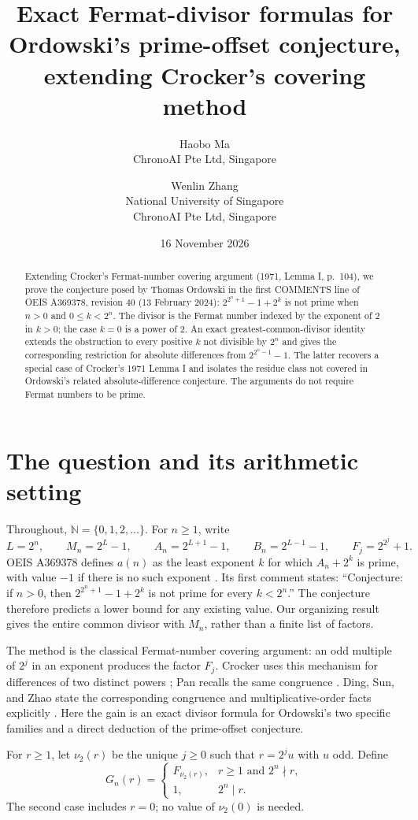 \documentclass[11pt]{article}
\title{Exact Fermat-divisor formulas for Ordowski's prime-offset conjecture, extending Crocker's covering method}
\author{Haobo Ma\\
  \small ChronoAI Pte Ltd, Singapore
  \and Wenlin Zhang\\
  \small National University of Singapore\\
  \small ChronoAI Pte Ltd, Singapore}
\date{16 November 2026}
\newcommand{\NN}{\mathbb{N}}
\newcommand{\vTwo}{\nu_2}
\begin{document}
\maketitle
\begin{abstract}
Extending Crocker's Fermat-number covering argument (1971, Lemma I, p.~104),
we prove the conjecture posed by Thomas Ordowski in the first COMMENTS line
of OEIS A369378, revision 40 (13 February 2024):
$2^{2^n+1}-1+2^k$ is not prime when $n>0$ and $0\leq k<2^n$.
The divisor is the Fermat number indexed by the exponent of $2$ in $k>0$;
the case $k=0$ is a power of $2$.
An exact greatest-common-divisor identity extends the obstruction to every
positive $k$ not divisible by $2^n$ and gives the corresponding restriction
for absolute differences from $2^{2^n-1}-1$.
The latter recovers a special case of Crocker's 1971 Lemma I and isolates
the residue class not covered in Ordowski's related absolute-difference
conjecture. The arguments do not require Fermat numbers to be prime.
\end{abstract}

\section{The question and its arithmetic setting}
Throughout, $\NN=\{0,1,2,\ldots\}$. For $n\geq1$, write
\[
 L=2^n,\qquad M_n=2^L-1,\qquad
 A_n=2^{L+1}-1,\qquad B_n=2^{L-1}-1,
 \qquad F_j=2^{2^j}+1.
\]
OEIS A369378 defines $a(n)$ as the least exponent $k$ for which $A_n+2^k$
is prime, with value $-1$ if there is no such exponent \cite{oeis}.
Its first comment states: ``Conjecture: if $n>0$, then
$2^{2^n+1}-1+2^k$ is not prime for every $k<2^n$.''
The conjecture therefore predicts a lower bound for any existing value.
Our organizing result gives the entire common divisor with $M_n$, rather
than a finite list of factors.

The method is the classical Fermat-number covering argument: an odd
multiple of $2^j$ in an exponent produces the factor $F_j$.
Crocker uses this mechanism for differences of two distinct powers
\cite[Lemma I, p.~104]{crocker}; Pan recalls the same congruence
\cite[Introduction, p.~1]{pan}. Ding, Sun, and Zhao state the corresponding
congruence and multiplicative-order facts explicitly
\cite[Lemmas 2.1--2.2]{ding}.
Here the gain is an exact divisor formula for Ordowski's two specific
families and a direct deduction of the prime-offset conjecture.

For $r\geq1$, let $\vTwo(r)$ be the unique $j\geq0$ such that
$r=2^j u$ with $u$ odd. Define
\[
 G_n(r)=
 \begin{cases}
  F_{\vTwo(r)},&r\geq1\text{ and }2^n\nmid r,\\
  1,&2^n\mid r.
 \end{cases}
\]
The second case includes $r=0$; no value of $\vTwo(0)$ is needed.
\end{document}
